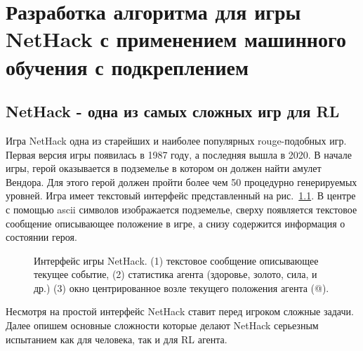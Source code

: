 \chapter{Разработка алгоритма для игры NetHack с применением машинного обучения с подкреплением}\label{ch:ch4}

\section{NetHack - одна из самых сложных игр для RL}

Игра NetHack одна из старейших и наиболее популярных rouge-подобных игр. Первая версия игры появилась в 1987 году, а последняя вышла в 2020. В начале игры, герой оказывается в подземелье в котором он должен найти амулет Вендора. Для этого герой должен пройти более чем 50 процедурно генерируемых уровней. Игра имеет текстовый интерфейс представленный на рис.~\ref{fig:nethack_map}. В центре с помощью ascii символов изображается подземелье, сверху появляется текстовое сообщение описывающее положение в игре, а снизу содержится информация о состоянии героя. 

\begin{figure}[ht]
\caption{Интерфейс игры NetHack. (1) текстовое сообщение описывающее текущее событие, (2) статистика агента (здоровье, золото, сила, и др.) (3) окно центрированное возле текущего положения агента (@).}
    \label{fig:nethack_map}
\end{figure}

Несмотря на простой интерфейс NetHack ставит перед игроком сложные задачи. Далее опишем основные сложности которые делают NetHack серьезным испытанием как для человека, так и для RL агента.


